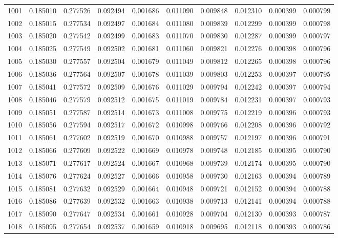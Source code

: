 \begin{tabular}{lrrrrrrrrr}
1001 & 0.185010 & 0.277526 & 0.092494 & 0.001686 & 0.011090 & 0.009848 & 0.012310 & 0.000399 & 0.000799 \\
1002 & 0.185015 & 0.277534 & 0.092497 & 0.001684 & 0.011080 & 0.009839 & 0.012299 & 0.000399 & 0.000798 \\
1003 & 0.185020 & 0.277542 & 0.092499 & 0.001683 & 0.011070 & 0.009830 & 0.012287 & 0.000399 & 0.000797 \\
1004 & 0.185025 & 0.277549 & 0.092502 & 0.001681 & 0.011060 & 0.009821 & 0.012276 & 0.000398 & 0.000796 \\
1005 & 0.185030 & 0.277557 & 0.092504 & 0.001679 & 0.011049 & 0.009812 & 0.012265 & 0.000398 & 0.000796 \\
1006 & 0.185036 & 0.277564 & 0.092507 & 0.001678 & 0.011039 & 0.009803 & 0.012253 & 0.000397 & 0.000795 \\
1007 & 0.185041 & 0.277572 & 0.092509 & 0.001676 & 0.011029 & 0.009794 & 0.012242 & 0.000397 & 0.000794 \\
1008 & 0.185046 & 0.277579 & 0.092512 & 0.001675 & 0.011019 & 0.009784 & 0.012231 & 0.000397 & 0.000793 \\
1009 & 0.185051 & 0.277587 & 0.092514 & 0.001673 & 0.011008 & 0.009775 & 0.012219 & 0.000396 & 0.000793 \\
1010 & 0.185056 & 0.277594 & 0.092517 & 0.001672 & 0.010998 & 0.009766 & 0.012208 & 0.000396 & 0.000792 \\
1011 & 0.185061 & 0.277602 & 0.092519 & 0.001670 & 0.010988 & 0.009757 & 0.012197 & 0.000396 & 0.000791 \\
1012 & 0.185066 & 0.277609 & 0.092522 & 0.001669 & 0.010978 & 0.009748 & 0.012185 & 0.000395 & 0.000790 \\
1013 & 0.185071 & 0.277617 & 0.092524 & 0.001667 & 0.010968 & 0.009739 & 0.012174 & 0.000395 & 0.000790 \\
1014 & 0.185076 & 0.277624 & 0.092527 & 0.001666 & 0.010958 & 0.009730 & 0.012163 & 0.000394 & 0.000789 \\
1015 & 0.185081 & 0.277632 & 0.092529 & 0.001664 & 0.010948 & 0.009721 & 0.012152 & 0.000394 & 0.000788 \\
1016 & 0.185086 & 0.277639 & 0.092532 & 0.001663 & 0.010938 & 0.009713 & 0.012141 & 0.000394 & 0.000788 \\
1017 & 0.185090 & 0.277647 & 0.092534 & 0.001661 & 0.010928 & 0.009704 & 0.012130 & 0.000393 & 0.000787 \\
1018 & 0.185095 & 0.277654 & 0.092537 & 0.001659 & 0.010918 & 0.009695 & 0.012118 & 0.000393 & 0.000786 \\

\end{tabular}
